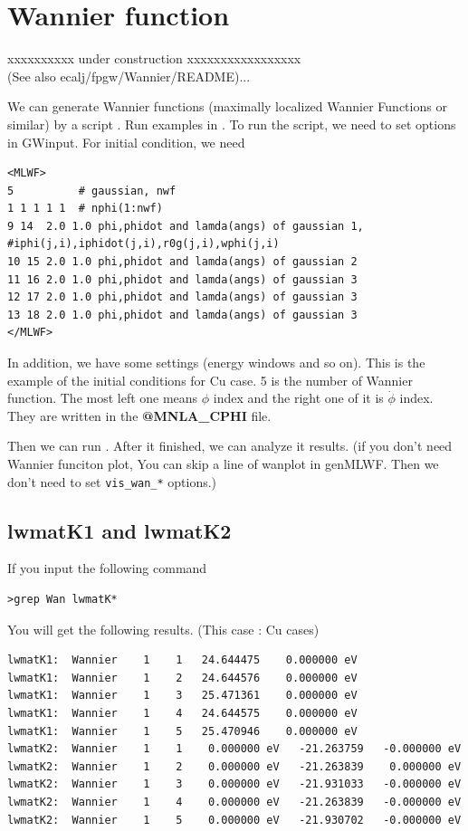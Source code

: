 {\section{Wannier function }
xxxxxxxxxx under construction xxxxxxxxxxxxxxxxx\\
(See also ecalj/fpgw/Wannier/README)...

We can generate Wannier functions 
(maximally localized Wannier Functions or similar) 
by a script .
Run examples in .
To run the script, we need to set options in GWinput.
For initial condition, we need
\begin{verbatim}
<MLWF>
5          # gaussian, nwf
1 1 1 1 1  # nphi(1:nwf)
9 14  2.0 1.0 phi,phidot and lamda(angs) of gaussian 1, #iphi(j,i),iphidot(j,i),r0g(j,i),wphi(j,i)
10 15 2.0 1.0 phi,phidot and lamda(angs) of gaussian 2
11 16 2.0 1.0 phi,phidot and lamda(angs) of gaussian 3
12 17 2.0 1.0 phi,phidot and lamda(angs) of gaussian 3
13 18 2.0 1.0 phi,phidot and lamda(angs) of gaussian 3
</MLWF>
\end{verbatim}
In addition, we have some settings (energy windows and so on).
This is the example of the initial conditions for Cu case. 
5 is the number of Wannier function. The most left one means $\phi$ index and the right one of it is $\dot\phi$ index. They are written in the {\bf @MNLA\_CPHI} file.

Then we can run . 
After it finished, we can analyze it results.
(if you don't need Wannier funciton plot, 
You can skip a line of wanplot in genMLWF. Then we  don't need to set
\verb+vis_wan_*+ options.)

\subsection{lwmatK1 and lwmatK2}
If you input the following command
\begin{verbatim}
>grep Wan lwmatK*
\end{verbatim}

You will get the following results. (This case : Cu cases)
\begin{verbatim}
lwmatK1:  Wannier    1    1   24.644475    0.000000 eV
lwmatK1:  Wannier    1    2   24.644576    0.000000 eV
lwmatK1:  Wannier    1    3   25.471361    0.000000 eV
lwmatK1:  Wannier    1    4   24.644575    0.000000 eV
lwmatK1:  Wannier    1    5   25.470946    0.000000 eV
lwmatK2:  Wannier    1    1    0.000000 eV   -21.263759   -0.000000 eV
lwmatK2:  Wannier    1    2    0.000000 eV   -21.263839    0.000000 eV
lwmatK2:  Wannier    1    3    0.000000 eV   -21.931033   -0.000000 eV
lwmatK2:  Wannier    1    4    0.000000 eV   -21.263839   -0.000000 eV
lwmatK2:  Wannier    1    5    0.000000 eV   -21.930702   -0.000000 eV
\end{verbatim}


}
